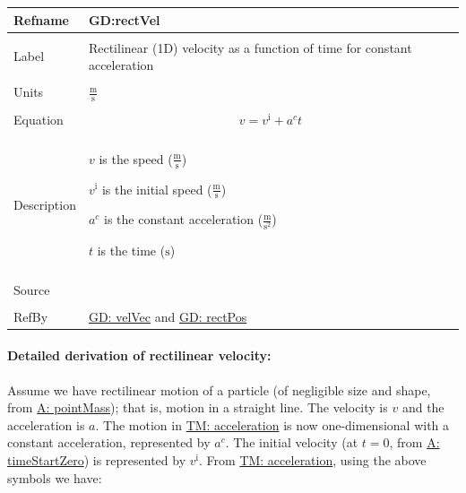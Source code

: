 \documentclass[12pt]{article}
\begin{document}
\vspace{\baselineskip}
\noindent
\begin{minipage}{\textwidth}
\begin{tabular}{>{\raggedright}p{}>{\raggedright\arraybackslash}p{}}
\toprule \textbf{Refname} & \textbf{GD:rectVel}
\label{GD:rectVel}
\\ \midrule \\
Label & Rectilinear (1D) velocity as a function of time for constant acceleration
        
\\ \midrule \\
Units & $\frac{\text{m}}{\text{s}}$
        
\\ \midrule \\
Equation & \begin{displaymath}
           v={v^{\text{i}}}+{a^{c}} t
           \end{displaymath}
\\ \midrule \\
Description & \begin{symbDescription}
              \item{$v$ is the speed ($\frac{\text{m}}{\text{s}}$)}
              \item{${v^{\text{i}}}$ is the initial speed ($\frac{\text{m}}{\text{s}}$)}
              \item{${a^{c}}$ is the constant acceleration ($\frac{\text{m}}{\text{s}^{2}}$)}
              \item{$t$ is the time (${\text{s}}$)}
              \end{symbDescription}
\\ \midrule \\
Source & \cite[(pg. 8)]{hibbeler2004}
         
\\ \midrule \\
RefBy & \hyperref[GD:velVec]{GD: velVec} and \hyperref[GD:rectPos]{GD: rectPos}
        
\\ \bottomrule
\end{tabular}
\end{minipage}
\paragraph{Detailed derivation of rectilinear velocity:}
\label{GD:rectVelDeriv}
Assume we have rectilinear motion of a particle (of negligible size and shape, from \hyperref[pointMass]{A: pointMass}); that is, motion in a straight line. The velocity is $v$ and the acceleration is $a$. The motion in \hyperref[TM:acceleration]{TM: acceleration} is now one-dimensional with a constant acceleration, represented by ${a^{c}}$. The initial velocity (at $t=0$, from \hyperref[timeStartZero]{A: timeStartZero}) is represented by ${v^{\text{i}}}$. From \hyperref[TM:acceleration]{TM: acceleration}, using the above symbols we have:
\end{document}
